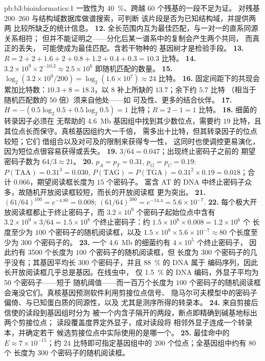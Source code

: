 \begin{solution}{pb:b3:bioinformatics:1}
一致性为 \qty{40}{\%}、跨越 $60$ 个残基的一段不足为证。
对残基 200--260 与结构域数据库做谱搜索，可判断
该片段是否为已知结构域，并提供两两
比较所缺乏的统计信息。
\textbf{12.} 全长范围内互为最佳匹配，与一对一的直系同源关系相符；
但并不能证明之——分化后某一谱系中的复制会产生两个共同，
而真正的丢失，
可能使成为最佳匹配。含若干物种的
基因树才是检验手段。
\textbf{13.} $R = 2 + 2 + 1.6 + 2 + 0.8 + 1.2 + 0.4 + 0.3 = 10.3$ 比特。
\textbf{14.} $3.2\times 10^{9}\times 2^{-10.3} \approx 2.5\times 10^{6}$
即随机匹配的数量。
\textbf{15.} $\log_{2}(3.2\times 10^{9}/200) = \log_{2}(1.6\times 10^{7})
\approx 24$ 比特。
\textbf{16.} 固定间距下的共现会累加比特数：$10.3 + 8 =
18.3$，以 $8$ 补上所缺的 $13.7$；余下约 $5.7$ 比特
（相当于随机匹配数的 $50$ 倍）须来自他处——如
可及性、更多的结合伙伴。
\textbf{17.} $H = -(0.5\log_{2}0.5 + 0.5\log_{2}0.5) = 1$ 比特；$R = 2 -
1 = 1$ 比特。
\textbf{18.} 细菌的转录因子必须在
无帮助的 \qty{4.6}{Mb} 基因组中找到其少数位点，需要约 $19$
比特，且其位点长而保守。真核基因组约大一千倍，
需多出十比特，但其转录因子的位点较短；它们
借组合以及对可及的限制来获得专一性，
这同时也使调控更易演化，
因为短位点很容易获得或丢失。
\textbf{19.} $3/64 = 0.047$；出现终止密码子之前的
期望密码子数为 $64/3 \approx 21$。
\textbf{20.} $p_{A} = p_{T} = 0.31$, $p_{G} = p_{C} = 0.19$: $P(\text{TAA})
= 0.31^{3} = 0.030$, $P(\text{TAG}) = P(\text{TGA}) = 0.31^{2}\times 0.19
= 0.018$；合计 $0.066$，期望阅读框长度为 $15$ 个密码子。
富含 AT 的 DNA 中终止密码子众多，故随机开放阅读框较短，而长的开放阅读框
更为突出。
\textbf{21.} $(61/64)^{100} = e^{-4.80} = 0.008$; $(61/64)^{300} =
e^{-14.4} = 5.6\times 10^{-7}$.
\textbf{22.} 每个极大开放阅读框都止于终止密码子，而 $3.2\times
10^{9}$ 个密码子起始位点中含有 $3.2\times 10^{9}\times 3/64 = 1.5\times
10^{8}$ 个终止密码子：约 $1.5\times 10^{8}\times 0.008 = 1.2\times 10^{6}$ 个
长度至少为 $100$ 个密码子的随机阅读框，以及 $1.5\times 10^{8}\times
5.6\times 10^{-7} \approx 80$ 个长度至少为 $300$ 个密码子的。
\textbf{23.} 一个 \qty{4.6}{Mb} 的细菌约有 $4\times 10^{5}$ 个终止密码子，
因此约有 \num{3500} 个长度为 $100$ 个密码子的随机阅读框，但
长度为 $300$ 个密码子的几乎没有；其基因平均长 $300$ 个密码子，并且 \qty{88}{\%} 的 DNA 属于
编码序列，因此长开放阅读框几乎总是基因。在线虫中，
仅 \qty{1.5}{\%} 的 DNA 编码，外显子平均为 $50$ 个密码子——短于
随机阈值——而一百万个长度为 $100$ 个密码子的随机阅读框
会淹没它们。真核基因预测软件利用剪接位点信号、
隐马尔可夫模型中的密码子偏倚、与已知蛋白质的同源性，以及
尤其是测序所得的转录本。
\textbf{24.} 来自剪接后信使的读段到基因组时分为
被一个内含子隔开的两段，断点即精确到碱基地标出两个剪接位点；
读段覆盖度界定外显子，成对读段将
相邻外显子连成一个转录本，并确定若干
候选剪接位点中实际使用的是哪一个。
\textbf{25.} 最佳命中的 $E \approx 7\times 10^{-15}$；约 $24$
比特即可指定基因组中的 $200$ 个位点；全基因组中约有 $80$ 个
长度为 $300$ 个密码子的随机阅读框。
\end{solution}
